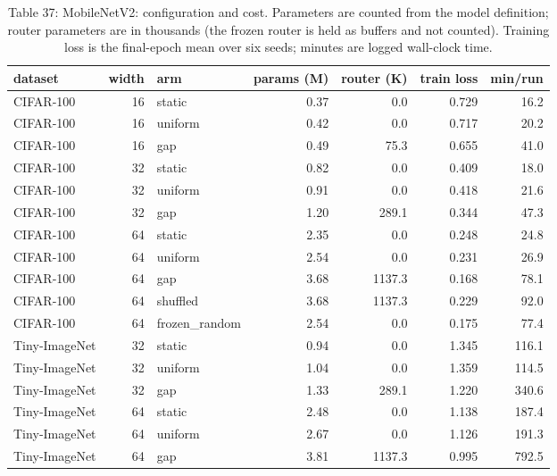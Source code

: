 \documentclass{article}
\begin{document}
\begin{table}
\caption{Table 37: MobileNetV2: configuration and cost. Parameters are counted from
the model definition; router parameters are in thousands (the frozen
router is held as buffers and not counted). Training loss is the
final-epoch mean over six seeds; minutes are logged wall-clock time.}

\begin{tabular}{l r l rr r r}
\toprule
dataset & width & arm & params (M) & router (K) & train loss & min/run \\
\midrule
CIFAR‑100 & 16 & static & 0.37 & 0.0 & 0.729 & 16.2 \\
CIFAR‑100 & 16 & uniform & 0.42 & 0.0 & 0.717 & 20.2 \\
CIFAR‑100 & 16 & gap & 0.49 & 75.3 & 0.655 & 41.0 \\
CIFAR‑100 & 32 & static & 0.82 & 0.0 & 0.409 & 18.0 \\
CIFAR‑100 & 32 & uniform & 0.91 & 0.0 & 0.418 & 21.6 \\
CIFAR‑100 & 32 & gap & 1.20 & 289.1 & 0.344 & 47.3 \\
CIFAR‑100 & 64 & static & 2.35 & 0.0 & 0.248 & 24.8 \\
CIFAR‑100 & 64 & uniform & 2.54 & 0.0 & 0.231 & 26.9 \\
CIFAR‑100 & 64 & gap & 3.68 & 1137.3 & 0.168 & 78.1 \\
CIFAR‑100 & 64 & shuffled & 3.68 & 1137.3 & 0.229 & 92.0 \\
CIFAR‑100 & 64 & frozen\_random & 2.54 & 0.0 & 0.175 & 77.4 \\
Tiny‑ImageNet & 32 & static & 0.94 & 0.0 & 1.345 & 116.1 \\
Tiny‑ImageNet & 32 & uniform & 1.04 & 0.0 & 1.359 & 114.5 \\
Tiny‑ImageNet & 32 & gap & 1.33 & 289.1 & 1.220 & 340.6 \\
Tiny‑ImageNet & 64 & static & 2.48 & 0.0 & 1.138 & 187.4 \\
Tiny‑ImageNet & 64 & uniform & 2.67 & 0.0 & 1.126 & 191.3 \\
Tiny‑ImageNet & 64 & gap & 3.81 & 1137.3 & 0.995 & 792.5 \\
\bottomrule
\end{tabular}
\end{table}
\end{document}
